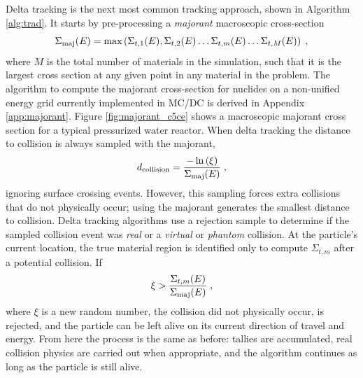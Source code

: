 Delta tracking is the next most common tracking approach, shown in Algorithm \ref{alg:trad}.
It starts by pre-processing a \textit{majorant} macroscopic cross-section
\begin{equation}
    \Sigma_{\text{maj}}(E) = \max\left({\Sigma_{t,1}(E), \Sigma_{t,2}(E) \dots \Sigma_{t,m}(E) \dots \Sigma_{t,M}(E)}\right) \; ,
\end{equation}
where $M$ is the total number of materials in the simulation, such that it is the largest cross section at any given point in any material in the problem.
The algorithm to compute the majorant cross-section for nuclides on a non-unified energy grid currently implemented in MC/DC is derived in Appendix \ref{app:majorant}.
Figure \ref{fig:majorant_c5ce} shows a macroscopic majorant cross section for a typical pressurized water reactor.
When delta tracking the distance to collision is always sampled with the majorant,
\begin{equation}
    d_{\text{collision}} = \frac{-\ln{(\xi)}}{\Sigma_{\text{maj}}(E)} \; ,
\end{equation}
ignoring surface crossing events.
However, this sampling forces extra collisions that do not physically occur; using the majorant generates the smallest distance to collision.
Delta tracking algorithms use a rejection sample to determine if the sampled collision event was \textit{real} or a \textit{virtual} or \textit{phantom} collision.
At the particle's current location, the true material region is identified only to compute $\Sigma_{t,m}$ after a potential collision.
If 
\begin{equation}
    \xi > \frac{\Sigma_{t,m}(E)}{\Sigma_{\text{maj}}(E)} \; ,
\end{equation}
where $\xi$ is a new random number, the collision did not physically occur, is rejected, and the particle can be left alive on its current direction of travel and energy.
From here the process is the same as before: tallies are accumulated, real collision physics are carried out when appropriate, and the algorithm continues as long as the particle is still alive.


